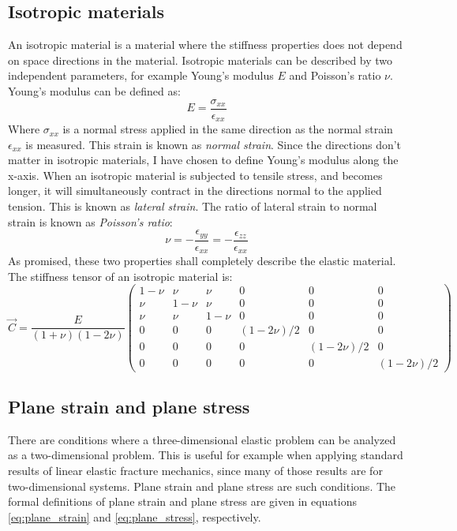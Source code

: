 \subsection{Isotropic materials}
An isotropic material is a material where the stiffness properties does not depend on space directions in the material. Isotropic materials can be described by two independent parameters, for example Young's modulus $E$ and Poisson's ratio $\nu$. 
Young's modulus can be defined as:
\begin{equation}
	E = \frac{\sigma_{xx}}{\epsilon_{xx}}
\end{equation}
Where $\sigma_{xx}$ is a normal stress applied in the same direction as the normal strain $\epsilon_{xx}$ is measured. This strain is known as \emph{normal strain}. Since the directions don't matter in isotropic materials, I have chosen to define Young's modulus along the x-axis. When an isotropic material is subjected to tensile stress, and becomes longer, it will simultaneously contract in the directions normal to the applied tension. This is known as \emph{lateral strain}. The ratio of lateral strain to normal strain is known as \emph{Poisson's ratio}:
\begin{equation}
	\nu = -\frac{\epsilon_{yy}}{\epsilon_{xx}} = -\frac{\epsilon_{zz}}{\epsilon_{xx}}
\end{equation}
As promised, these two properties shall completely describe the elastic material. The stiffness tensor of an isotropic material is:
\begin{equation}
	\vec{C} = 
   	\frac{E}{(1+\nu)(1-2\nu)}
   	\begin{pmatrix}
		1-\nu & \nu & \nu & 0 & 0 & 0 \\
		\nu & 1-\nu & \nu & 0 & 0 & 0 \\
		   \nu & \nu & 1-\nu & 0 & 0 & 0 \\
		   0 & 0 & 0 & (1-2\nu)/2 & 0 & 0 \\
		   0 & 0 & 0 & 0 & (1-2\nu)/2 & 0 \\
		   0 & 0 & 0 & 0 & 0 & (1-2\nu)/2
	\end{pmatrix}
\end{equation}

\subsection{Plane strain and plane stress}
There are conditions where a three-dimensional elastic problem can be analyzed as a two-dimensional problem. This is useful for example when applying standard results of linear elastic fracture mechanics, since many of those results are for two-dimensional systems. Plane strain and plane stress are such conditions. The formal definitions of plane strain and plane stress are given in equations \ref{eq:plane_strain} and \ref{eq:plane_stress}, respectively.

